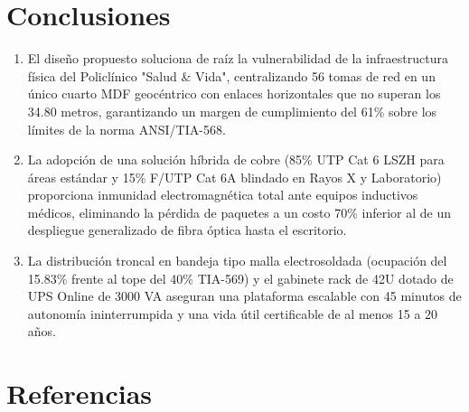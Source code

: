 \documentclass[11pt,a4paper]{article}
\begin{document}
\section{Conclusiones}

\begin{enumerate}[noitemsep]
    \item El diseño propuesto soluciona de raíz la vulnerabilidad de la infraestructura física del Policlínico "Salud \& Vida", centralizando 56 tomas de red en un único cuarto MDF geocéntrico con enlaces horizontales que no superan los 34.80 metros, garantizando un margen de cumplimiento del 61\% sobre los límites de la norma ANSI/TIA-568.
    \item La adopción de una solución híbrida de cobre (85\% UTP Cat 6 LSZH para áreas estándar y 15\% F/UTP Cat 6A blindado en Rayos X y Laboratorio) proporciona inmunidad electromagnética total ante equipos inductivos médicos, eliminando la pérdida de paquetes a un costo 70\% inferior al de un despliegue generalizado de fibra óptica hasta el escritorio.
    \item La distribución troncal en bandeja tipo malla electrosoldada (ocupación del 15.83\% frente al tope del 40\% TIA-569) y el gabinete rack de 42U dotado de UPS Online de 3000 VA aseguran una plataforma escalable con 45 minutos de autonomía ininterrumpida y una vida útil certificable de al menos 15 a 20 años.
\end{enumerate}

\section{Referencias}
\end{document}

